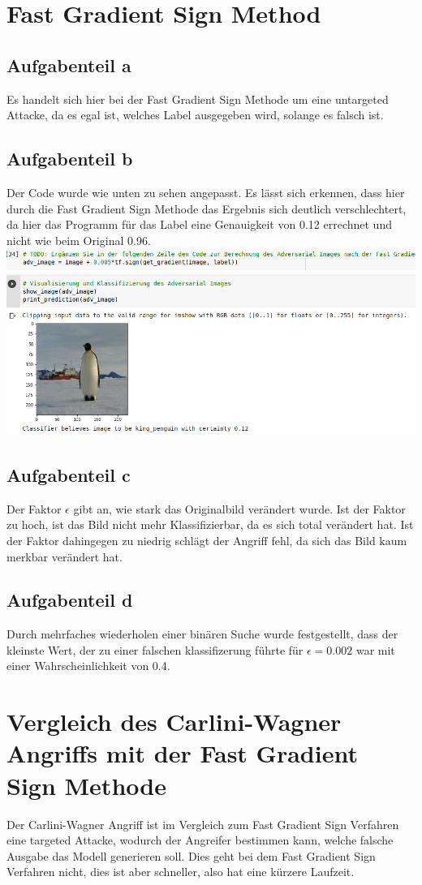 \documentclass[a4paper,12pt,
headsepline,           %
oneside,               %
pointlessnumbers,      %
bibtotoc,              %
BCOR15mm               %
]{scrbook}
\begin{document}
\section*{Fast Gradient Sign Method}

\subsection*{Aufgabenteil a}
Es handelt sich hier bei der Fast Gradient Sign Methode um eine untargeted Attacke, da es egal ist, welches Label ausgegeben wird, solange es falsch ist.

\subsection*{Aufgabenteil b}
Der Code wurde wie unten zu sehen angepasst. Es lässt sich erkennen, dass hier durch die Fast Gradient Sign Methode das Ergebnis sich deutlich verschlechtert, da hier
das Programm für das Label eine Genauigkeit von 0.12 errechnet und nicht wie beim Original 0.96.
\includegraphics[scale=0.5]{Task4-3_2.png}
\subsection*{Aufgabenteil c}
Der Faktor $\epsilon$ gibt an, wie stark das Originalbild verändert wurde. Ist der Faktor zu hoch, ist das Bild nicht mehr Klassifizierbar, da es sich total verändert hat. Ist der Faktor dahingegen zu niedrig schlägt der Angriff fehl, da sich das Bild kaum merkbar verändert hat.

\subsection*{Aufgabenteil d}
Durch mehrfaches wiederholen einer binären Suche wurde festgestellt, dass der kleinste Wert, der zu einer falschen klassifizerung führte für $\epsilon = 0.002$ war mit einer Wahrscheinlichkeit von 0.4. 

\section*{Vergleich des Carlini-Wagner Angriffs mit der Fast Gradient Sign Methode}
Der Carlini-Wagner Angriff ist im Vergleich zum Fast Gradient Sign Verfahren eine targeted Attacke, wodurch der 
Angreifer bestimmen kann, welche falsche Ausgabe das Modell generieren soll. Dies geht bei dem Fast Gradient Sign Verfahren nicht, dies ist aber schneller, also hat eine kürzere Laufzeit.
\end{document}
